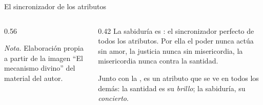 \begin{frame}{El sincronizador de los atributos}
\begin{columns}[c,onlytextwidth]
\begin{column}{0.56\textwidth}
\centering
{}\par\vspace{1pt}
{\fontsize{5}{6}\selectfont\color{gris}\textit{Nota.} Elaboración propia a partir de la imagen ``El mecanismo divino'' del material del autor.\par}
\end{column}
\begin{column}{0.42\textwidth}\small
La sabiduría es : el sincronizador perfecto de todos los atributos. Por ella el poder nunca actúa sin amor, la justicia nunca sin misericordia, la misericordia nunca contra la santidad.\par\medskip
Junto con la , es un atributo que se ve en todos los demás: la santidad es su \emph{brillo}; la sabiduría, su \emph{concierto}.\par\medskip
{}
\end{column}
\end{columns}
\end{frame}

